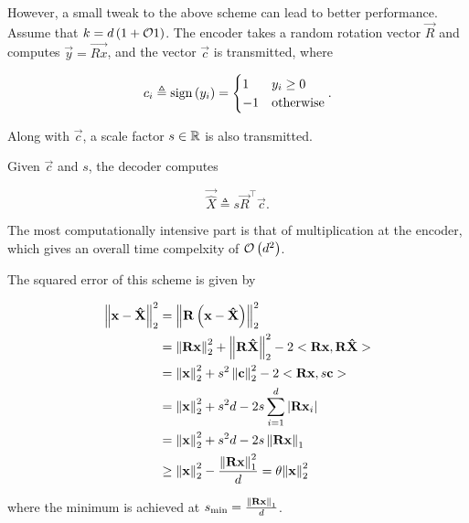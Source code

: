 \documentclass[twoside]{article}
\begin{document}
However, a small tweak to the above scheme can lead to better performance.
Assume that \(k = d\left(1+\mathcal O{1}\right)\). The encoder takes a random rotation vector
\(\vec{R}\) and computes \(\vec{y} = \vec{Rx}\), and the vector \(\vec{c}\)
is transmitted, where

\begin{equation}
    c_i \triangleq \mathrm{sign}\left(y_i\right) =
    \begin{cases}
        1 & y_i \ge 0 \\
        -1 & \mathrm{otherwise}
    \end{cases}.
    \label{eq:ci-def}
\end{equation}

Along with \(\vec{c}\), a scale factor \(s\in\mathbb R\) is also transmitted.

Given \(\vec{c}\) and \(s\), the decoder computes

\begin{equation}
    \vec{\hat{X}} \triangleq s\vec{R}^\top\vec{c}.
    \label{eq:xhat-dec}
\end{equation}

The most computationally intensive part is that of multiplication at the 
encoder, which gives an overall time compelxity of \(\mathcal O\left(d^2\right)\).

The squared error of this scheme is given by

\begin{align}
    \left\lVert\boldsymbol{\mathbf{x}}-\boldsymbol{\mathbf{\hat{X}}}\right\rVert_2^2 &= \left\lVert\boldsymbol{\mathbf{R}}\left(\boldsymbol{\mathbf{x}}-\boldsymbol{\mathbf{\hat{X}}}\right)\right\rVert_2^2 \\
                                     &= \left\lVert\boldsymbol{\mathbf{Rx}}\right\rVert_2^2 + \left\lVert\boldsymbol{\mathbf{R\hat{X}}}\right\rVert_2^2 - 2<\boldsymbol{\mathbf{Rx}},\boldsymbol{\mathbf{R\hat{X}}}> \\
                                     &= \left\lVert\boldsymbol{\mathbf{x}}\right\rVert_2^2 + s^2\left\lVert\boldsymbol{\mathbf{c}}\right\rVert_2^2 - 2<\boldsymbol{\mathbf{Rx}},s\boldsymbol{\mathbf{c}}> \\
                                     &= \left\lVert\boldsymbol{\mathbf{x}}\right\rVert_2^2 + s^2d - 2s\sum_{i=1}^d\left\vert\boldsymbol{\mathbf{Rx}}_i\right\vert \\
                                     &= \left\lVert\boldsymbol{\mathbf{x}}\right\rVert_2^2 + s^2d - 2s\left\lVert\boldsymbol{\mathbf{Rx}}\right\rVert_1 \\
                                     &\ge \left\lVert\boldsymbol{\mathbf{x}}\right\rVert_2^2 - \frac{\left\lVert\boldsymbol{\mathbf{Rx}}\right\rVert_1^2}{d} = \theta{\left\lVert\boldsymbol{\mathbf{x}}\right\rVert_2^2}
\end{align}

where the minimum is achieved at \(s_{\mathrm{min}} = \frac{\left\lVert\boldsymbol{\mathbf{Rx}}\right\rVert_1}{d}\).
\end{document}
